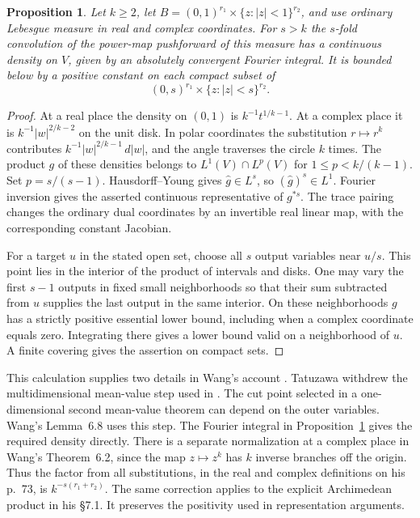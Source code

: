 \documentclass[11pt,letterpaper]{article}
\newtheorem{proposition}[proposition]{Proposition}
\theoremstyle{definition}
\numberwithin{equation}{section}
\begin{document}
\begin{proposition}\label{prop:harch}
Let $k\ge2$, let $B=(0,1)^{r_1}\times\{z:|z|<1\}^{r_2}$, and use
ordinary Lebesgue measure in real and complex coordinates. For $s>k$
the $s$-fold convolution of the power-map pushforward of this measure
has a continuous density on $V$, given by an absolutely convergent
Fourier integral. It is bounded below by a positive constant on each
compact subset of
\[
       (0,s)^{r_1}\times\{z:|z|<s\}^{r_2}.
\]
\end{proposition}
\begin{proof}
At a real place the density on $(0,1)$ is $k^{-1}t^{1/k-1}$.
At a complex place it is $k^{-1}|w|^{2/k-2}$ on the unit disk.
In polar coordinates the substitution $r\mapsto r^k$ contributes
$k^{-1}|w|^{2/k-1}\,d|w|$, and the angle traverses the circle
$k$ times. The product $g$ of these densities belongs to
$L^1(V)\cap L^p(V)$ for $1\le p<k/(k-1)$. Set $p=s/(s-1)$.
Hausdorff--Young gives $\widehat g\in L^s$, so $(\widehat g)^s\in L^1$.
Fourier inversion gives the asserted continuous representative of
$g^{*s}$. The trace pairing changes the ordinary dual coordinates
by an invertible real linear map, with the corresponding constant
Jacobian.

For a target $u$ in the stated open set, choose all $s$ output
variables near $u/s$. This point lies in the interior of the product
of intervals and disks. One may vary the first $s-1$ outputs in fixed
small neighborhoods so that their sum subtracted from $u$ supplies
the last output in the same interior. On these neighborhoods $g$
has a strictly positive essential lower bound, including when a
complex coordinate equals zero. Integrating there gives a lower
bound valid on a neighborhood of $u$. A finite covering gives the
assertion on compact sets.
\end{proof}

This calculation supplies two details in Wang's account
\cite[Chs.~5--7]{hwang}.
Tatuzawa \cite[pp.~263--264]{htat75} withdrew the multidimensional
mean-value step used in \cite{htat73}. The cut point selected in a
one-dimensional second mean-value theorem can depend on the outer
variables. Wang's Lemma~6.8 uses this step. The Fourier integral in
Proposition~\ref{prop:harch} gives the required density directly.
There is a separate normalization at a complex place in Wang's
Theorem~6.2, since the map $z\mapsto z^k$ has $k$ inverse branches off the
origin. Thus the factor from all substitutions, in the real and complex
definitions on his p.~73, is $k^{-s(r_1+r_2)}$. The same correction
applies to the explicit Archimedean product in his \S7.1.
It preserves the positivity used in representation arguments.
\end{document}
